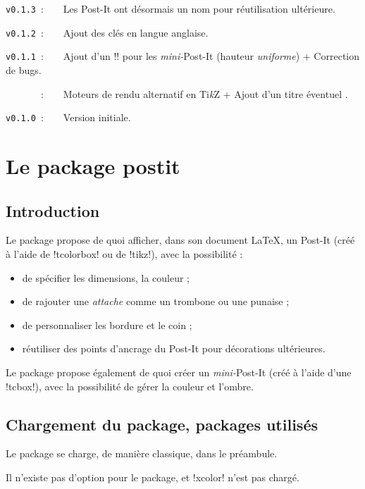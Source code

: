 \documentclass[french,a4paper,11pt]{article}
\providecommand\tikzlogo{Ti\textit{k}Z}
\let\TikZ\tikzlogo
\begin{document}
\verb|v0.1.3|~:~~~~Les Post-It ont désormais un nom pour réutilisation ultérieure.

\verb|v0.1.2|~:~~~~Ajout des clés en langue anglaise.

\verb|v0.1.1|~:~~~~Ajout d'un \motcletex!\vphantom! pour les \textit{mini-}Post-It (hauteur \textit{uniforme}) + Correction de bugs.

\verb|      |~:~~~~Moteurs de rendu alternatif en \TikZ{} + Ajout d'un titre éventuel .

\verb|v0.1.0|~:~~~~Version initiale.

\newpage

\section{Le package postit}

\subsection{Introduction}

\begin{noteblock}
Le package propose de quoi afficher, dans son document \LaTeX, un Post-It (créé à l'aide de \packagetex!tcolorbox! ou de \packagetex!tikz!), avec la possibilité :

\begin{itemize}
	\item de spécifier les dimensions, la couleur ;
	\item de rajouter une \textit{attache} comme un trombone ou une punaise ;
	\item de personnaliser les bordure et le coin ;
	\item réutiliser des points d'ancrage du Post-It pour décorations ultérieures.
\end{itemize}

Le package propose également de quoi créer un \textit{mini-}Post-It (créé à l'aide d'une \motcletex!tcbox!), avec la possibilité de gérer la couleur et l'ombre.
\end{noteblock}

\subsection{Chargement du package, packages utilisés}

\begin{importantblock}
Le package se charge, de manière classique, dans le préambule.

Il n'existe pas d'option pour le package, et \packagetex!xcolor! n'est pas chargé.
\end{importantblock}
\end{document}
